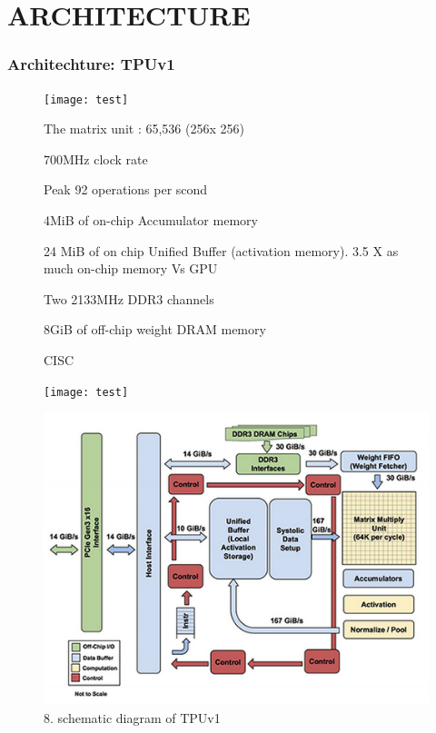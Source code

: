 \documentclass[c]{beamer}
\begin{document}
		

\section{ARCHITECTURE}
	\begin{frame}
	\frametitle{Architechture: TPUv1}
			\begin{figure}[ht]
  {\begin{minipage}[t]{150pt}
    \texttt{[image: test]}
    	\begin{itemize}
		\justifying
		{\small	\item The matrix unit : 65,536 (256x 256)
            \item700MHz clock rate
            \item Peak 92 operations per scond 
            \item 4MiB of on-chip Accumulator memory
            \item 24 MiB of on chip Unified Buffer (activation memory). 3.5 X  as much on-chip memory Vs GPU
            \item Two 2133MHz DDR3 channels
            \item 8GiB of off-chip weight DRAM memory
            \item CISC}

		\end{itemize}		
  \end{minipage}}
  \hfill
  {\begin{minipage}[t]{180pt}
    \texttt{[image: test]}
    
                \includegraphics[scale=.5]{images/8tpuv1.png}
            \caption
            {8. schematic diagram of TPUv1}
            \label{graph: computational cost Vs accuracy}
        
  \end{minipage}}
\end{figure}
    \end{frame}
\end{document}
